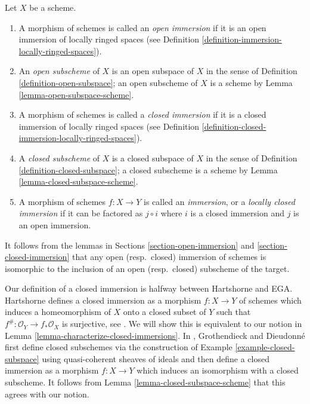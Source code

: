 \begin{definition}
\label{definition-immersion}
Let $X$ be a scheme.
\begin{enumerate}
\item A morphism of schemes is called an {\it open immersion}
if it is an open immersion of locally ringed spaces (see
Definition \ref{definition-immersion-locally-ringed-spaces}).
\item An {\it open subscheme} of $X$ is an open subspace of $X$
in the sense of Definition \ref{definition-open-subspace}; an open subscheme
of $X$ is a scheme by Lemma \ref{lemma-open-subspace-scheme}.
\item A morphism of schemes is called a {\it closed immersion}
if it is a closed immersion of locally ringed spaces (see
Definition \ref{definition-closed-immersion-locally-ringed-spaces}).
\item A {\it closed subscheme} of $X$ is a closed subspace of $X$
in the sense of Definition \ref{definition-closed-subspace}; a closed subscheme
is a scheme by Lemma \ref{lemma-closed-subspace-scheme}.
\item A morphism of schemes $f : X \to Y$ is called an {\it immersion},
or a {\it locally closed immersion} if it can be factored as
$j \circ i$ where $i$ is a closed immersion and $j$ is an open
immersion.
\end{enumerate}
\end{definition}

\noindent
It follows from the lemmas in Sections \ref{section-open-immersion} and
\ref{section-closed-immersion} that any open (resp.\ closed) immersion of
schemes is isomorphic to the inclusion of an open (resp.\ closed) subscheme
of the target.

\medskip\noindent
Our definition of a closed immersion is halfway between Hartshorne
and EGA. Hartshorne defines a closed immersion as a morphism $f : X \to Y$ of
schemes which induces a homeomorphism of $X$ onto a closed subset of
$Y$ such that $f^\# : \mathcal{O}_Y \to f_*\mathcal{O}_X$ is surjective, see
\cite[Page 85]{H}. We will show this is equivalent to our notion in
Lemma \ref{lemma-characterize-closed-immersions}. In \cite{EGA},
Grothendieck and Dieudonn\'e first define closed subschemes
via the construction of Example \ref{example-closed-subspace}
using quasi-coherent sheaves of ideals and then define a closed immersion
as a morphism $f : X \to Y$ which induces an isomorphism with a
closed subscheme. It follows from Lemma \ref{lemma-closed-subspace-scheme}
that this agrees with our notion.

